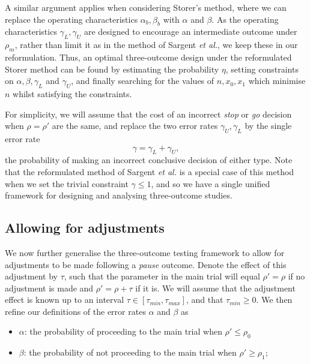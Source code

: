 \documentclass{bmcart}
\begin{document}
A similar argument applies when considering Storer's method, where we can replace the operating characteristics $\alpha_b, \beta_b$ with $\alpha$ and $\beta$. As the operating characteristics $\gamma_L, \gamma_U$ are designed to encourage an intermediate outcome under $\rho_m$, rather than limit it as in the method of Sargent \emph{et al.}, we keep these in our reformulation. Thus, an optimal three-outcome design under the reformulated Storer method can be found by estimating the probability $\eta$, setting constraints on $\alpha, \beta, \gamma_L$ and $\gamma_U$, and finally searching for the values of  $n, x_0, x_1$ which minimise $n$ whilst satisfying the constraints. 

For simplicity, we will assume that the cost of an incorrect \emph{stop} or \emph{go} decision when $\rho = \rho'$ are the same, and replace the two error rates $\gamma_U, \gamma_L$ by the single error rate
$$
\gamma = \gamma_L + \gamma_U,
$$
the probability of making an incorrect conclusive decision of either type. Note that the reformulated method of Sargent \emph{et al.} is a special case of this method when we set the trivial constraint $\gamma \leq 1$, and so we have a single unified framework for designing and analysing three-outcome studies.

\subsection{Allowing for adjustments}\label{sec:adjustments}


We now further generalise the three-outcome testing framework to allow for adjustments to be made following a \emph{pause} outcome. Denote the effect of this adjustment by $\tau$, such that the parameter in the main trial will equal $\rho' = \rho$ if no adjustment is made and $\rho' = \rho + \tau$ if it is. We will assume that the adjustment effect is known up to an interval $\tau \in [\tau_{min}, \tau_{max}]$, and that $\tau_{min} \geq 0$. We then refine our definitions of the error rates $\alpha$ and $\beta$ as

\begin{itemize}
\item $\alpha$: the probability of proceeding to the main trial when $\rho' \leq \rho_0$
\item $\beta$: the probability of not proceeding to the main trial when $\rho' \geq \rho_1$;
\end{itemize}
\end{document}
